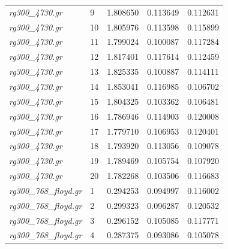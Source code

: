 \documentclass[12pt]{article}
\begin{document}
\begin{longtable}{l|l|lll}
\textit{rg300\_4730.gr}          &  9        & 1.808650               & 0.113649             & 0.112631                     \\
\textit{rg300\_4730.gr}          &  10       & 1.805976               & 0.113598             & 0.115899                     \\
\textit{rg300\_4730.gr}          &  11       & 1.799024               & 0.100087             & 0.117284                     \\
\textit{rg300\_4730.gr}          &  12       & 1.817401               & 0.117614             & 0.112459                     \\
\textit{rg300\_4730.gr}          &  13       & 1.825335               & 0.100887             & 0.114111                     \\
\textit{rg300\_4730.gr}          &  14       & 1.853041               & 0.116985             & 0.106702                     \\
\textit{rg300\_4730.gr}          &  15       & 1.804325               & 0.103362             & 0.106481                     \\
\textit{rg300\_4730.gr}          &  16       & 1.786946               & 0.114903             & 0.120008                     \\
\textit{rg300\_4730.gr}          &  17       & 1.779710               & 0.106953             & 0.120401                     \\
\textit{rg300\_4730.gr}          &  18       & 1.793920               & 0.113056             & 0.109078                     \\
\textit{rg300\_4730.gr}          &  19       & 1.789469               & 0.105754             & 0.107920                     \\
\textit{rg300\_4730.gr}          &  20       & 1.782268               & 0.103506             & 0.116683                     \\ \hline
\textit{rg300\_768\_floyd.gr}    &  1        & 0.294253               & 0.094997             & 0.116002                     \\
\textit{rg300\_768\_floyd.gr}    &  2        & 0.299323               & 0.096287             & 0.120532                     \\
\textit{rg300\_768\_floyd.gr}    &  3        & 0.296152               & 0.105085             & 0.117771                     \\
\textit{rg300\_768\_floyd.gr}    &  4        & 0.287375               & 0.093086             & 0.105078                     \\

\end{longtable}
\end{document}
